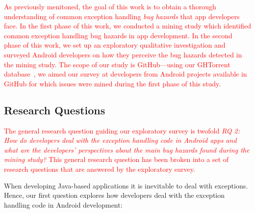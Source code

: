 \textcolor{red}{As previously menitoned, the goal of this work is to obtain a thorough understanding of common exception handling \emph{bug hazards} that app developers face. In the first phase of this work, we conducted a mining study which identified common exception handling bug hazards in app development.
 In the second phase of this work, we set up an exploratory qualitative investigation and surveyed Android developers on how they perceive the bug hazards detected in the mining study. The scope of our study is GitHub---using our GHTorrent database~\cite{Gousi13}, we aimed our survey at developers from Android projects available in GitHub for which issues were mined during the first phase of this study.}




\subsection{Research Questions}

\textcolor{red}{The general research question guiding our exploratory survey is twofold \emph{RQ 2: How do developers deal with the exception handling code in Android apps and what are the developers' perspectives about the main bug hazards found during the mining study?} This general research question has been broken into a set of research questions that are answered by the exploratory survey.}

When developing Java-based applications it is inevitable to deal with exceptions. Hence, our first question explores how developers deal with the exception handling code in Android development:

